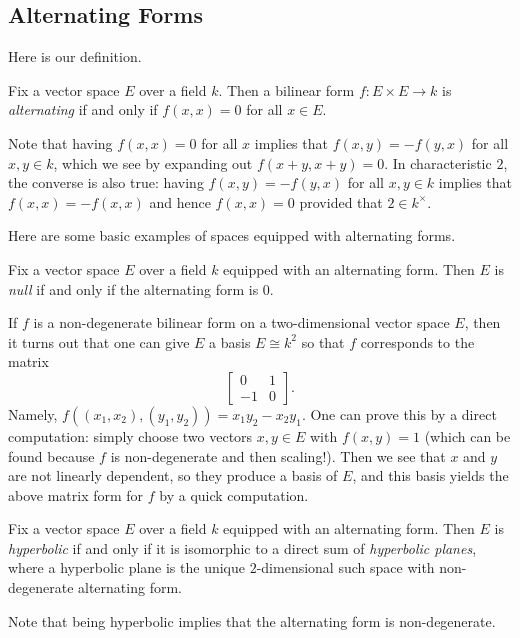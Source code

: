 \documentclass[../notes.tex]{subfiles}
\begin{document}
\subsection{Alternating Forms}
Here is our definition.
\begin{definition}[alternating]
	Fix a vector space $E$ over a field $k$. Then a bilinear form $f\colon E\times E\to k$ is \textit{alternating} if and only if $f(x,x)=0$ for all $x\in E$.
\end{definition}
\begin{remark}
	Note that having $f(x,x)=0$ for all $x$ implies that $f(x,y)=-f(y,x)$ for all $x,y\in k$, which we see by expanding out $f(x+y,x+y)=0$. In characteristic $2$, the converse is also true: having $f(x,y)=-f(y,x)$ for all $x,y\in k$ implies that $f(x,x)=-f(x,x)$ and hence $f(x,x)=0$ provided that $2\in k^\times$.
\end{remark}
Here are some basic examples of spaces equipped with alternating forms.
\begin{definition}[null]
	Fix a vector space $E$ over a field $k$ equipped with an alternating form. Then $E$ is \textit{null} if and only if the alternating form is $0$.
\end{definition}
\begin{example}
	If $f$ is a non-degenerate bilinear form on a two-dimensional vector space $E$, then it turns out that one can give $E$ a basis $E\cong k^2$ so that $f$ corresponds to the matrix
	\[\begin{bmatrix}
		0 & 1 \\ -1 & 0
	\end{bmatrix}.\]
	Namely, $f((x_1,x_2),(y_1,y_2))=x_1y_2-x_2y_1$. One can prove this by a direct computation: simply choose two vectors $x,y\in E$ with $f(x,y)=1$ (which can be found because $f$ is non-degenerate and then scaling!). Then we see that $x$ and $y$ are not linearly dependent, so they produce a basis of $E$, and this basis yields the above matrix form for $f$ by a quick computation.
\end{example}
\begin{definition}[hyperbolic]
	Fix a vector space $E$ over a field $k$ equipped with an alternating form. Then $E$ is \textit{hyperbolic} if and only if it is isomorphic to a direct sum of \textit{hyperbolic planes}, where a hyperbolic plane is the unique $2$-dimensional such space with non-degenerate alternating form.
\end{definition}
\begin{remark}
	Note that being hyperbolic implies that the alternating form is non-degenerate.
\end{remark}
\end{document}
